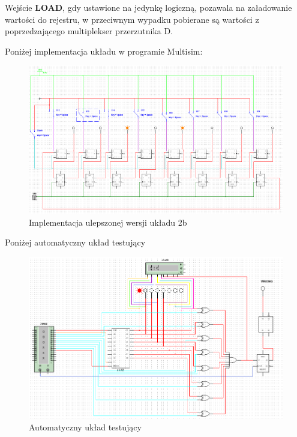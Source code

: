 \documentclass{article}
\begin{document}
Wejście \textbf{LOAD}, gdy ustawione na jedynkę logiczną, pozawala na załadowanie wartości do rejestru, w przeciwnym
wypadku pobierane są wartości z poprzedzającego multiplekser przerzutnika D.

Poniżej implementacja układu w programie Multisim:

\begin{figure}[H]
    \centering
    \includegraphics[width=\textwidth]{uklad_2_nowy.png}
    \caption{Implementacja ulepszonej wersji układu 2b}
\end{figure}

Poniżej automatyczny układ testujący

\begin{figure}[H]
    \centering
    \includegraphics[width=\textwidth]{tester_2.png}
    \caption{Automatyczny układ testujący}
\end{figure}
\end{document}
